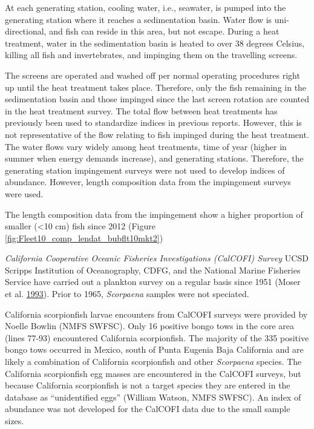 \documentclass[12pt,]{article}
\begin{document}
At each generating station, cooling water, i.e., seawater, is pumped
into the generating station where it reaches a sedimentation basin.
Water flow is uni-directional, and fish can reside in this area, but not
escape. During a heat treatment, water in the sedimentation basin is
heated to over 38 degrees Celsius, killing all fish and invertebrates,
and impinging them on the travelling screens.

The screens are operated and washed off per normal operating procedures
right up until the heat treatment takes place. Therefore, only the fish
remaining in the sedimentation basin and those impinged since the last
screen rotation are counted in the heat treatment survey. The total flow
between heat treatments has previously been used to standardize indices
in previous reports. However, this is not representative of the flow
relating to fish impinged during the heat treatment. The water flows
vary widely among heat treatments, time of year (higher in summer when
energy demands increase), and generating stations. Therefore, the
generating station impingement surveys were not used to develop indices
of abundance. However, length composition data from the impingement
surveys were used.

The length composition data from the impingement show a higher
proportion of smaller (\textless{}10 cm) fish since 2012 (Figure
\ref{fig:Fleet10_comp_lendat_bubflt10mkt2})

\emph{California Cooperative Oceanic Fisheries Investigations (CalCOFI)
Survey} UCSD Scripps Institution of Oceanography, CDFG, and the National
Marine Fisheries Service have carried out a plankton survey on a regular
basis since 1951 (Moser et al. \protect\hyperlink{ref-Moser1993}{1993}).
Prior to 1965, \emph{Scorpaena} samples were not speciated.

California scorpionfish larvae encounters from CalCOFI surveys were
provided by Noelle Bowlin (NMFS SWFSC). Only 16 positive bongo tows in
the core area (lines 77-93) encountered California scorpionfish. The
majority of the 335 positive bongo tows occurred in Mexico, south of
Punta Eugenia Baja California and are likely a combination of California
scorpionfish and other \emph{Scorpaena} species. The California
scorpionfish egg masses are encountered in the CalCOFI surveys, but
because California scorpionfish is not a target species they are entered
in the database as ``unidentified eggs'' (William Watson, NMFS SWFSC).
An index of abundance was not developed for the CalCOFI data due to the
small sample sizes.
\end{document}
